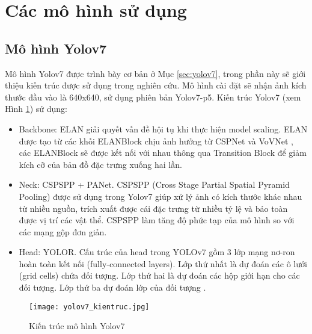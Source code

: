 \documentclass[../the.tex]{subfiles}
\begin{document}
\section{Các mô hình sử dụng}
\label{sec:model}
\subsection{Mô hình Yolov7}
{\fontsize{13}{12} \selectfont

	Mô hình Yolov7 được trình bày cơ bản ở Mục \ref{sec:yolov7}, trong phần này sẽ giới thiệu kiến trúc được sử dụng trong nghiên cứu. Mô hình cài đặt sẽ nhận ảnh kích thước đầu vào là 640x640, sử dụng phiên bản Yolov7-p5. Kiến trúc Yolov7 (xem Hình \ref{fig:yolov7_kientruc}) sử dụng:
	\begin{itemize}
		\item Backbone: ELAN giải quyết vấn đề hội tụ khi thực hiện model scaling. ELAN được tạo từ các khối ELANBlock chịu ảnh hưởng từ CSPNet \cite{wang2019cspnet} và VoVNet \cite{lee2019energy}, các ELANBlock sẽ được kết nối với nhau thông qua Transition Block để giảm kích cỡ của bản đồ đặc trưng xuống hai lần.
		\item Neck: CSPSPP + PANet. CSPSPP (Cross Stage Partial Spatial Pyramid Pooling) được sử dụng trong Yolov7 giúp xử lý ảnh có kích thước khác nhau từ nhiều nguồn, trích xuất được cái đặc trưng từ nhiều tỷ lệ và bảo toàn được vị trí các vật thể. CSPSPP làm tăng độ phức tạp của mô hình so với các mạng gộp đơn giản.
		\item Head: YOLOR. Cấu trúc của head trong YOLOv7
		      gồm 3 lớp mạng nơ-ron hoàn toàn kết nối
		      (fully-connected layers). Lớp thứ nhất
		      là dự đoán các ô lưới (grid cells) chứa đối
		      tượng. Lớp thứ hai là dự đoán các hộp giới hạn cho các đối tượng. Lớp thứ ba dự đoán lớp của đối tượng \cite{cachuayol7}.
	\end{itemize}

}

\begin{figure}[H]
	\centering
	\texttt{[image: yolov7\_kientruc.jpg]}
	\caption{Kiến trúc mô hình Yolov7}
	\label{fig:yolov7_kientruc}
\end{figure}
\end{document}

